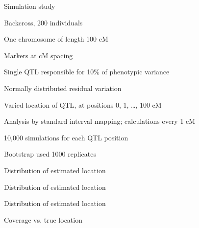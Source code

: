 \documentclass[aspectratio=169,12pt,t]{beamer}
\begin{document}
\begin{frame}{Simulation study}


  \vspace*{-5mm}

  \bbi
\item {\hilit Backcross}, 200 individuals

\item One chromosome of length 100 cM

\item Markers at { cM spacing}

\item {\hilit Single QTL} responsible for 10\% of phenotypic variance

\item Normally distributed residual variation

\item {\hilit Varied location of QTL}, at positions 0, 1, \dots, 100 cM

\item Analysis by standard interval mapping;
  calculations every 1 cM

\item 10,000 simulations for each QTL position

\item Bootstrap used 1000 replicates
\ei

\note{
}
\end{frame}


\begin{frame}[c]{Distribution of estimated location}


\note{
}
\end{frame}




\begin{frame}[c]{Distribution of estimated location}


\note{
}
\end{frame}




\begin{frame}[c]{Distribution of estimated location}


\note{
}
\end{frame}



\begin{frame}[c]{Coverage vs. true location}


\note{
}
\end{frame}
\end{document}
